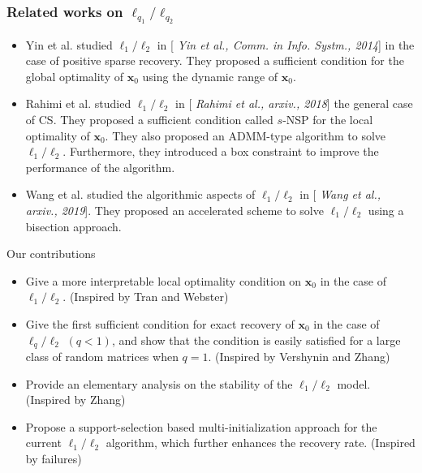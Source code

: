\documentclass[11pt]{beamer}
\def\x{{\mathbf x}}
\begin{document}
\begin{frame}
\frametitle{Related works on $\ell_{q_1}/\ell_{q_2}$} 

\begin{itemize}

\item  
Yin et al. studied $\ell_1/\ell_2$ in [{\color{blue} \it Yin et al., Comm. in Info. Systm., 2014}] in the case of positive sparse recovery. They proposed a sufficient condition for the global optimality of $\x_0$ using the dynamic range of $\x_0$.  

\medskip

\item Rahimi et al. studied $\ell_1/\ell_2$ in [{\color{blue} \it Rahimi et al., arxiv., 2018}] the general case of CS. They proposed a sufficient condition called $s$-NSP for the local optimality of $\x_0$. They also proposed an ADMM-type algorithm to solve $\ell_1/\ell_2$. Furthermore, they introduced a box constraint to improve the performance of the algorithm.   

\medskip

\item Wang et al. studied the algorithmic aspects of $\ell_1/\ell_2$ in [{\color{blue} \it Wang et al., arxiv., 2019}]. They proposed an accelerated scheme to solve $\ell_1/\ell_2$ using a bisection approach. 

\end{itemize}

\end{frame}

\begin{frame}
{Our contributions}


\begin{itemize}

\item  
Give a more interpretable local optimality condition on $\x_0$ in the case of $\ell_1/\ell_2$. (Inspired by {\color{blue} Tran and Webster}) 

\medskip

\item Give the first sufficient condition for exact recovery of $\x_0$ in the case of $\ell_q/\ell_2$ $(q<1)$, and show that the condition is easily satisfied for a large class of random matrices when $q=1$. (Inspired by {\color{blue} Vershynin and Zhang})    

\medskip

\item Provide an elementary analysis on the stability of the $\ell_1/\ell_2$ model. (Inspired by {\color{blue} Zhang}) 

\medskip

\item Propose a support-selection based multi-initialization approach for the current $\ell_1/\ell_2$ algorithm, which further enhances the recovery rate. (Inspired by {\color{red} failures})     

\end{itemize}

\end{frame}
\end{document}
